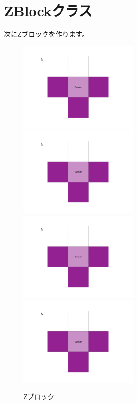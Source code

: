 \section{ZBlockクラス}
次にZブロックを作ります。
\begin{figure}[h]
  \includegraphics[width=60mm, page=17]{images/Blocks.pdf}
  \includegraphics[width=60mm, page=18]{images/Blocks.pdf}
  \includegraphics[width=60mm, page=19]{images/Blocks.pdf}
  \includegraphics[width=60mm, page=20]{images/Blocks.pdf}
  \caption{Zブロック}
\end{figure}

\newpage
